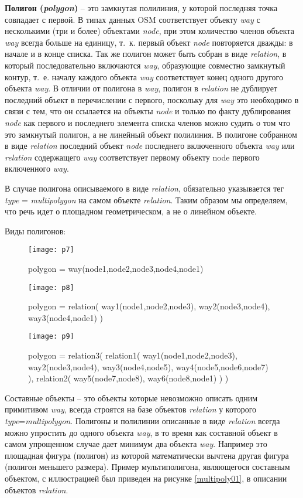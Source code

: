 \textbf{Полигон (\emph{polygon})} -- это замкнутая полилиния, у которой 
последняя точка совпадает с первой. В типах данных OSM соответствует объекту 
\emph{way} с несколькими (три и более) объектами \emph{node}, при этом 
количество членов объекта \emph{way} всегда больше на единицу, т.~к. первый 
объект \emph{node} повторяется дважды: в начале и в конце списка. Так же 
полигон может быть собран в виде \emph{relation}, в который последовательно 
включаются \emph{way}, образующие совместно замкнутый контур, т.~е. началу 
каждого объекта \emph{way} соответствует конец одного другого объекта 
\emph{way}. В отличии от полигона в \emph{way}, полигон в \emph{relation} не 
дублирует последний объект в перечислении с первого, поскольку для \emph{way} 
это необходимо в связи с тем, что он ссылается на объекты \emph{node} и 
только по факту дублирования \emph{node} как первого и последнего элемента 
списка членов можно судить о том что это замкнутый полигон, а не линейный 
объект полилиния. В полигоне собранном в виде \emph{relation} последний объект 
\emph{node} последнего включенного объекта \emph{way} или \emph{relation} 
содержащего \emph{way} соответствует первому объекту node первого включенного 
\emph{way}.

В случае полигона описываемого в виде \emph{relation}, обязательно указывается 
тег \emph{type} = \emph{multipolygon} на самом объекте \emph{relation}. Таким 
образом мы определяем, что речь идет о площадном геометрическом, а не о 
линейном объекте.

Виды полигонов:

\begin{figure}[ht!]
    \center
    \texttt{[image: p7]}
    \caption{polygon = way(node1,node2,node3,node4,node1)}
    \texttt{[image: p8]}
    \caption{polygon = relation( way1(node1,node2,node3), 
        way2(node3,node4), way3(node4,node1) )}
    \texttt{[image: p9]}
    \caption{polygon = relation3( relation1( way1(node1,node2,node3), 
        way2(node3,node4), way3(node4,node5), 
        way4(node5,node6,node7) ), relation2( way5(node7,node8), 
        way6(node8,node1) ) )}
\end{figure}

Составные объекты -- это объекты которые невозможно описать одним примитивом 
\emph{way}, всегда строятся на базе объектов \emph{relation} у которого 
\emph{type}=\emph{multipolygon}. Полигоны и полилинии описанные в виде 
\emph{relation} всегда можно упростить до одного объекта \emph{way}, в то 
время как составной объект в самом упрощенном случае дает минимум два объекта 
\emph{way}. Например это площадная фигура (полигон) из которой математически 
вычтена другая фигура (полигон меньшего размера). Пример мультиполигона, 
являющегося составным объектом, с иллюстрацией был приведен на рисунке 
\ref{multipoly01}, в описании объектов \emph{relation}.

